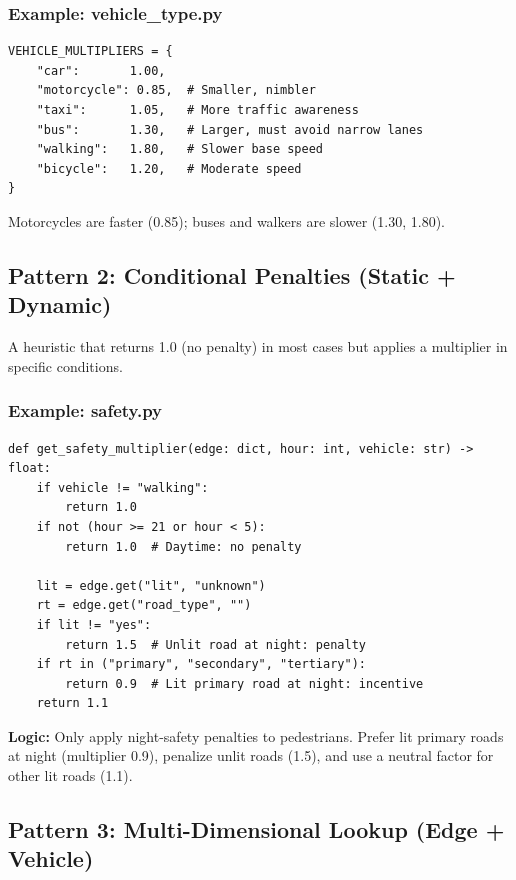 \documentclass[12pt,a4paper]{article}
\begin{document}
\subsubsection{Example: vehicle\_type.py}

\begin{lstlisting}
VEHICLE_MULTIPLIERS = {
    "car":       1.00,
    "motorcycle": 0.85,  # Smaller, nimbler
    "taxi":      1.05,   # More traffic awareness
    "bus":       1.30,   # Larger, must avoid narrow lanes
    "walking":   1.80,   # Slower base speed
    "bicycle":   1.20,   # Moderate speed
}
\end{lstlisting}

Motorcycles are faster (0.85); buses and walkers are slower (1.30, 1.80).

\subsection{Pattern 2: Conditional Penalties (Static + Dynamic)}

A heuristic that returns 1.0 (no penalty) in most cases but applies a multiplier in specific conditions.

\subsubsection{Example: safety.py}

\begin{lstlisting}
def get_safety_multiplier(edge: dict, hour: int, vehicle: str) -> float:
    if vehicle != "walking":
        return 1.0
    if not (hour >= 21 or hour < 5):
        return 1.0  # Daytime: no penalty

    lit = edge.get("lit", "unknown")
    rt = edge.get("road_type", "")
    if lit != "yes":
        return 1.5  # Unlit road at night: penalty
    if rt in ("primary", "secondary", "tertiary"):
        return 0.9  # Lit primary road at night: incentive
    return 1.1
\end{lstlisting}

\textbf{Logic:} Only apply night-safety penalties to pedestrians. Prefer lit primary roads at night (multiplier 0.9), penalize unlit roads (1.5), and use a neutral factor for other lit roads (1.1).

\subsection{Pattern 3: Multi-Dimensional Lookup (Edge + Vehicle)}
\end{document}
